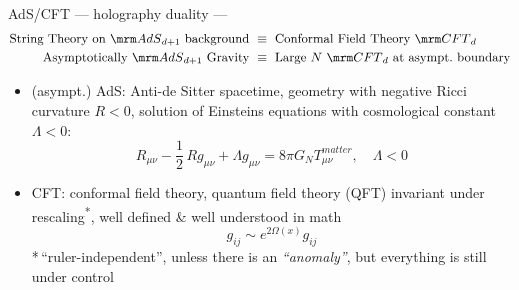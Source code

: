 \documentclass[aspectratio=169,10pt
	,noamsthm
]{beamer}
\begin{document}
\begin{frame}{AdS/CFT --- holography duality}{%
	\textcite{Maldacena:1997re} --- %
}
\vspace{-1\baselineskip}
\begin{align}
\stateAdsCft
\end{align}
\vspace{-1.5\baselineskip}
\pause
\begin{itemize}
\item (asympt.) AdS: Anti-de Sitter spacetime, geometry with negative Ricci curvature $R < 0$, solution of Einsteins equations with cosmological constant $\Lambda < 0$:
\begin{equation}
	R_{\mu\nu} - \frac{1}{2}\,R g_{\mu\nu}
	+ \Lambda g_{\mu\nu}
	= 8\pi G_N T_{\mu\nu}^{\textit{matter}},\quad
	\Lambda < 0
\label{eq:einstein}
\end{equation}

\pause
\item CFT: conformal field theory, quantum field theory (QFT) invariant under rescaling\textsuperscript{*}, well defined \& well understood in math
\begin{equation}
	g_{ij} \sim e^{2\Omega(x)} g_{ij}
\end{equation}
*\,``ruler-independent'', {\footnotesize unless there is an \textit{``anomaly''}, but everything is still under control}
\end{itemize}
\vspace{\baselineskip}
\end{frame}
\end{document}
